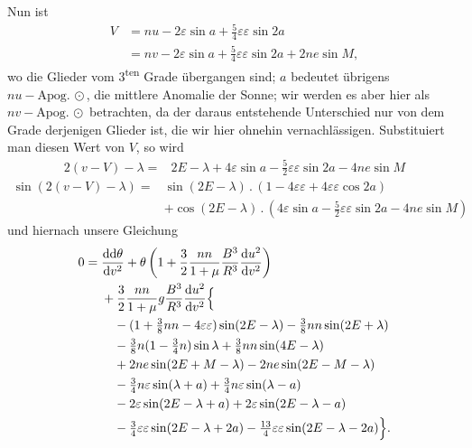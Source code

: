 \par\noindent\hspace*{\parindent}Nun ist
\[
\begin{aligned}
V&=nu-2\varepsilon\sin a+\tfrac54\varepsilon\varepsilon\sin2a\\
 &=nv-2\varepsilon\sin a+\tfrac54\varepsilon\varepsilon\sin2a+2ne\sin M,
\end{aligned}
\]
\noindent wo die Glieder vom 3\textsuperscript{ten} Grade übergangen sind;
\(a\) bedeutet übrigens \(nu-\mathrm{Apog.}\,\odot\), die mittlere Anomalie der Sonne;
wir werden es aber hier als \(nv-\mathrm{Apog.}\,\odot\) betrachten, da der daraus
entstehende Unterschied nur von dem Grade derjenigen Glieder ist, die wir
hier ohnehin vernachlässigen. Substituiert man diesen Wert von \(V\), so wird
\[
\begin{aligned}
2(v-V)-\lambda={}&2E-\lambda+4\varepsilon\sin a
-\tfrac52\varepsilon\varepsilon\sin2a-4ne\sin M
\end{aligned}
\]
\[
\begin{aligned}
\sin(2(v-V)-\lambda)={}&\sin(2E-\lambda)\mathbin{.}
(1-4\varepsilon\varepsilon+4\varepsilon\varepsilon\cos2a)\\
&+\cos(2E-\lambda)\mathbin{.}
(4\varepsilon\sin a-\tfrac52\varepsilon\varepsilon\sin2a-4ne\sin M)
\end{aligned}
\]
\noindent und hiernach unsere Gleichung
\[
\begin{aligned}
0={}&\frac{\mathrm{dd}\theta}{\mathrm{d}v^2}
+\theta\left(1+\frac32\frac{nn}{1+\mu}\frac{B^3}{R^3}
\frac{\mathrm{d}u^2}{\mathrm{d}v^2}\right)\\
&+\frac32\frac{nn}{1+\mu}g\frac{B^3}{R^3}\frac{\mathrm{d}u^2}{\mathrm{d}v^2}\Bigl\{\\
&\quad -(1+\tfrac38nn-4\varepsilon\varepsilon)\sin(2E-\lambda)
-\tfrac38nn\sin(2E+\lambda)\\
&\quad -\tfrac38n(1-\tfrac34n)\sin\lambda+\tfrac38nn\sin(4E-\lambda)\\
&\quad +2ne\sin(2E+M-\lambda)-2ne\sin(2E-M-\lambda)\\
&\quad -\tfrac34n\varepsilon\sin(\lambda+a)+\tfrac34n\varepsilon\sin(\lambda-a)\\
&\quad -2\varepsilon\sin(2E-\lambda+a)+2\varepsilon\sin(2E-\lambda-a)\\
&\quad -\tfrac34\varepsilon\varepsilon\sin(2E-\lambda+2a)
-\tfrac{13}{4}\varepsilon\varepsilon\sin(2E-\lambda-2a)\Bigr\}.
\end{aligned}
\]
